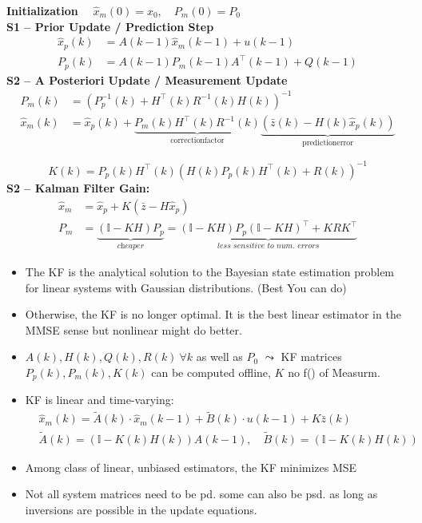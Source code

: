 \textbf{Initialization} $\quad\widehat{x}_m(0) = x_0, \quad P_m(0) = P_0$ \\
\textbf{S1 -- Prior Update / Prediction Step}
\begin{align*}
    \widehat{x}_p(k) &= A(k-1) \widehat{x}_m(k-1) + u(k-1) \\
    P_p(k) &= A(k-1)P_m(k-1)A^\top(k-1) + Q(k-1)
\end{align*}
\textbf{S2 -- A Posteriori Update / Measurement Update}
\begin{align*}
    P_m(k) &= \left( P_p^{-1}(k) + H^\top(k) R^{-1}(k) H(k) \right)^{-1}\\
    \widehat{x}_m(k) &= \widehat{x}_p(k) + 
    \underbrace{P_m(k) H^\top(k) R^{-1}(k)}_{\mathrm{correction factor}}
    \underbrace{\left( \bar{z}(k) - H(k) \widehat{x}_p(k) \right)}_{\mathrm{prediction error}}
\end{align*}

\begin{equation*}
    K(k) = P_p(k) H^\top(k) \left( H(k) P_p(k) H^\top(k) \!+\! R(k) \right)^{-1} 
\end{equation*}
\textbf{S2 -- Kalman Filter Gain:}
\begin{align*}
    \widehat{x}_m &= \widehat{x}_p + K \left( \bar{z} \!-\! H \widehat{x}_p \right) \\
    P_m &= \underbrace{\left( \mathbb{I} - K H \right) P_p}_{\textit{cheaper}}
    = \underbrace{\left( \mathbb{I} - K H \right) P_p \left( \mathbb{I} - K H \right)^\top + K R K^\top}_{\textit{less sensitive to num. errors}}
\end{align*}

\begin{itemize}[leftmargin=5pt]
    \item The KF is the analytical solution to the Bayesian state estimation problem for linear systems with Gaussian distributions. (Best You can do)
    \item Otherwise, the KF is no longer optimal. It is the best linear estimator in the MMSE sense but nonlinear might do better.
    \item $A(k),H(k),Q(k),R(k) \ \forall k$ as well as $P_0$ $\leadsto$ KF matrices $P_p(k), P_m(k), K(k)$ can be computed offline, $K$ no f() of Measurm.
    \item KF is linear and time-varying:
    \begin{align*}
        &\widehat{x}_m(k) = \tilde{A}(k) \cdot \widehat{x}_m(k-1) + \tilde{B}(k) \cdot u(k-1) + K\bar{z}(k) \\
        &\tilde{A}(k) = (\mathbb{I} - K(k)H(k)) A(k-1), \quad \tilde{B}(k) = (\mathbb{I} - K(k)H(k))
    \end{align*}
    \item Among class of linear, unbiased estimators, the KF minimizes MSE
    \item Not all system matrices need to be pd. some can also be psd. as long as inversions are possible in the update equations.
\end{itemize}

